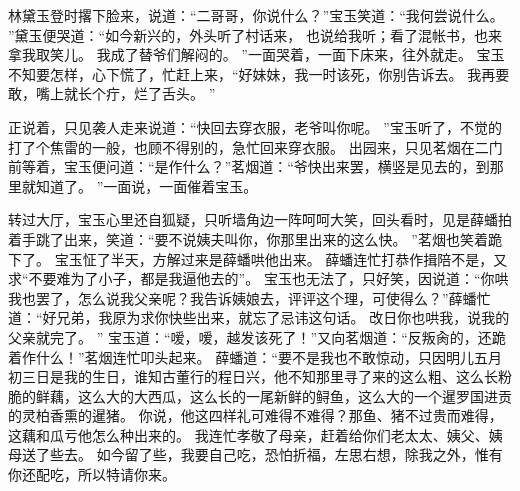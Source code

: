 林黛玉登时撂下脸来，说道：“二哥哥，你说什么？”宝玉笑道：“我何尝说什么。
”黛玉便哭道：“如今新兴的，外头听了村话来，
也说给我听；看了混帐书，也来拿我取笑儿。
我成了替爷们解闷的。
”一面哭着，一面下床来，往外就走。
宝玉不知要怎样，心下慌了，忙赶上来，“好妹妹，我一时该死，你别告诉去。
我再要敢，嘴上就长个疔，烂了舌头。
”\par
正说着，只见袭人走来说道：“快回去穿衣服，老爷叫你呢。
”宝玉听了，不觉的打了个焦雷的一般，也顾不得别的，急忙回来穿衣服。
出园来，只见茗烟在二门前等着，宝玉便问道：“是作什么？”茗烟道：“爷快出来罢，横竖是见去的，到那里就知道了。
”一面说，一面催着宝玉。
\par
转过大厅，宝玉心里还自狐疑，只听墙角边一阵呵呵大笑，回头看时，见是薛蟠拍着手跳了出来，笑道：“要不说姨夫叫你，你那里出来的这么快。
”茗烟也笑着跪下了。
宝玉怔了半天，方解过来是薛蟠哄他出来。
薛蟠连忙打恭作揖陪不是，又求“不要难为了小子，都是我逼他去的”。
宝玉也无法了，只好笑，因说道：“你哄我也罢了，怎么说我父亲呢？我告诉姨娘去，评评这个理，可使得么？”薛蟠忙道：“好兄弟，我原为求你快些出来，就忘了忌讳这句话。
改日你也哄我，说我的父亲就完了。
”
宝玉道：“嗳，嗳，越发该死了！”又向茗烟道：“反叛肏的，还跪着作什么！”茗烟连忙叩头起来。
薛蟠道：“要不是我也不敢惊动，只因明儿五月初三日是我的生日，谁知古董行的程日兴，他不知那里寻了来的这么粗、这么长粉脆的鲜藕，这么大的大西瓜，这么长的一尾新鲜的鲟鱼，这么大的一个暹罗国进贡的灵柏香熏的暹猪。
你说，他这四样礼可难得不难得？那鱼、猪不过贵而难得，这藕和瓜亏他怎么种出来的。
我连忙孝敬了母亲，赶着给你们老太太、姨父、姨母送了些去。
如今留了些，我要自己吃，恐怕折福，左思右想，除我之外，惟有你还配吃，所以特请你来。
